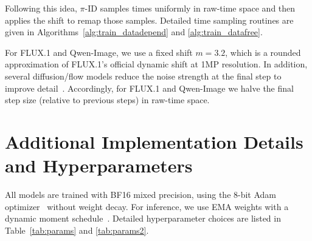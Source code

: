 Following this idea, $\pi$-ID samples times uniformly in raw-time space and then applies the shift to remap those samples. Detailed time sampling routines are given in Algorithms~\ref{alg:train_datadepend} and \ref{alg:train_datafree}.

For FLUX.1 and Qwen-Image, we use a fixed shift $m=3.2$, which is a rounded approximation of FLUX.1's official dynamic shift at 1MP resolution. In addition, several diffusion/flow models reduce the noise strength at the final step to improve detail~\citep{Karras2022edm,qwen}. Accordingly, for FLUX.1 and Qwen-Image we halve the final step size (relative to previous steps) in raw-time space.

\section{Additional Implementation Details and Hyperparameters}
\label{sec:hyperparam}

All models are trained with BF16 mixed precision, using the 8-bit Adam optimizer~\citep{adam,dettmers20228bit} without weight decay. For inference, we use EMA weights with a dynamic moment schedule~\citep{karras2024analyzingimprovingtrainingdynamics}. Detailed hyperparameter choices are listed in Table~\ref{tab:params} and \ref{tab:params2}.


\begin{table}[t]
    \centering
    \caption{FLUX.1 schnell evaluation results on COCO-10k dataset and HPSv2 prompt set.}
    \label{tab:schnell}
\end{table}

